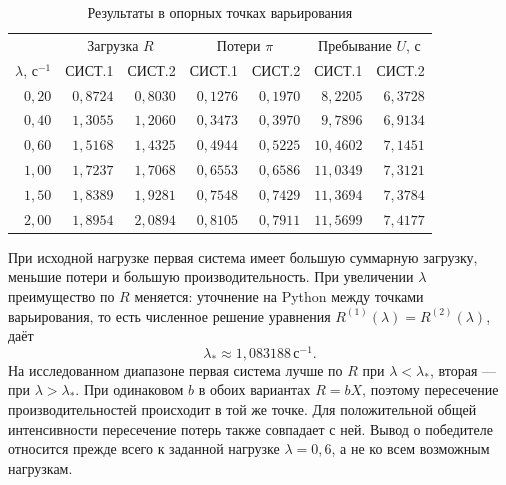 \documentclass[a4paper,12pt]{article}
\newcommand{\secunit}{\,\text{с}^{-1}}
\begin{document}
\begin{table}[H]\centering\small
\caption{Результаты в опорных точках варьирования}
\setlength{\tabcolsep}{6pt}
\begin{tabular}{@{}r rrrrrr@{}}\toprule
&\multicolumn{2}{c}{Загрузка $R$}&\multicolumn{2}{c}{Потери $\pi$}&\multicolumn{2}{c}{Пребывание $U$, с}\\
$\lambda$, $\text{с}^{-1}$ & СИСТ.1 & СИСТ.2 & СИСТ.1 & СИСТ.2 & СИСТ.1 & СИСТ.2\\\midrule
$0{,}20$ & $0{,}8724$ & $0{,}8030$ & $0{,}1276$ & $0{,}1970$ & $8{,}2205$ & $6{,}3728$ \\
$0{,}40$ & $1{,}3055$ & $1{,}2060$ & $0{,}3473$ & $0{,}3970$ & $9{,}7896$ & $6{,}9134$ \\
$0{,}60$ & $1{,}5168$ & $1{,}4325$ & $0{,}4944$ & $0{,}5225$ & $10{,}4602$ & $7{,}1451$ \\
$1{,}00$ & $1{,}7237$ & $1{,}7068$ & $0{,}6553$ & $0{,}6586$ & $11{,}0349$ & $7{,}3121$ \\
$1{,}50$ & $1{,}8389$ & $1{,}9281$ & $0{,}7548$ & $0{,}7429$ & $11{,}3694$ & $7{,}3784$ \\
$2{,}00$ & $1{,}8954$ & $2{,}0894$ & $0{,}8105$ & $0{,}7911$ & $11{,}5699$ & $7{,}4177$ \\
\bottomrule\end{tabular}
\end{table}

При исходной нагрузке первая система имеет большую суммарную загрузку, меньшие потери и большую производительность. При увеличении $\lambda$ преимущество по $R$ меняется: уточнение на Python между точками варьирования, то есть численное решение уравнения $R^{(1)}(\lambda)=R^{(2)}(\lambda)$, даёт
\[
\lambda_*\approx1{,}083188\secunit.
\]
На исследованном диапазоне первая система лучше по $R$ при $\lambda<\lambda_*$, вторая --- при $\lambda>\lambda_*$. При одинаковом $b$ в обоих вариантах $R=bX$, поэтому пересечение производительностей происходит в той же точке. Для положительной общей интенсивности пересечение потерь также совпадает с ней. Вывод о победителе относится прежде всего к заданной нагрузке $\lambda=0{,}6$, а не ко всем возможным нагрузкам.
\end{document}
